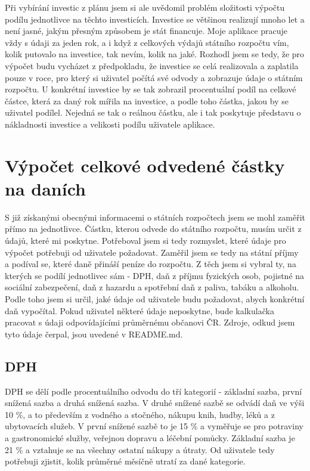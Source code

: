 \documentclass[11pt,a4paper,twoside,openright]{report}
\begin{document}
Při vybírání investic z plánu jsem si ale uvědomil problém složitosti výpočtu podílu
jednotlivce na těchto investicích. Investice se většinou realizují mnoho let a není jasné,
jakým přesným způsobem je stát financuje. Moje aplikace pracuje vždy s údaji za jeden rok,
a i když z celkových výdajů státního rozpočtu vím, kolik putovalo na investice, tak nevím,
kolik na jaké. Rozhodl jsem se tedy, že pro výpočet budu vycházet z předpokladu, že investice
se celá realizovala a zaplatila pouze v roce, pro který si uživatel počítá své odvody a
zobrazuje údaje o státním rozpočtu. U konkrétní investice by se tak zobrazil procentuální
podíl na celkové částce, která za daný rok mířila na investice, a podle toho částka, jakou
by se uživatel podílel. Nejedná se tak o reálnou částku, ale i tak poskytuje představu o
nákladnosti investice a velikosti podílu uživatele aplikace.

\section{Výpočet celkové odvedené částky na daních}

S již získanými obecnými informacemi o státních rozpočtech jsem se mohl zaměřit přímo na jednotlivce.
Částku, kterou odvede do státního rozpočtu, musím určit z údajů, které mi poskytne. Potřeboval jsem si tedy
 rozmyslet, které údaje pro výpočet potřebuji od uživatele požadovat. Zaměřil jsem se tedy na státní příjmy
a podíval se, které daně přináší peníze do rozpočtu. Z těch jsem si vybral ty, na kterých se podílí jednotlivec
sám - DPH, daň z příjmu fyzických osob, pojistné na sociální zabezpečení, daň z hazardu a spotřební daň z
paliva, tabáku a alkoholu. Podle toho jsem si určil, jaké údaje od uživatele budu požadovat, abych konkrétní
daň vypočítal. Pokud uživatel některé údaje neposkytne, bude kalkulačka pracovat s údaji odpovídajícími průměrnému
občanovi ČR. Zdroje, odkud jsem tyto údaje čerpal, jsou uvedené v README.md. 

\subsection{DPH}

DPH se dělí podle procentuálního odvodu do tří kategorií - základní sazba, první snížená
sazba a druhá snížená sazba. V druhé snížené sazbě se odvádí daň ve výši 10 \%, a to především
z vodného a stočného, nákupu knih, hudby, léků a z ubytovacích služeb. V první snížené sazbě to
je 15 \% a vyměřuje se pro potraviny a gastronomické služby, veřejnou dopravu a léčební pomůcky.
Základní sazba je 21 \% a vztahuje se na všechny ostatní nákupy a útraty. Od uživatele
tedy potřebuji zjistit, kolik průměrné měsíčně utratí za dané kategorie.
\end{document}
